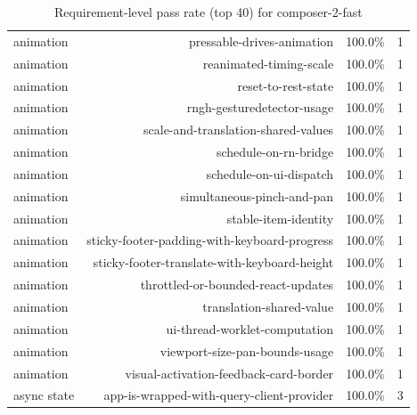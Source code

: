 \begin{table}[htbp]
\begin{tabular}{lrrr}
animation & pressable-drives-animation & 100.0\% & 1 \\
animation & reanimated-timing-scale & 100.0\% & 1 \\
animation & reset-to-rest-state & 100.0\% & 1 \\
animation & rngh-gesturedetector-usage & 100.0\% & 1 \\
animation & scale-and-translation-shared-values & 100.0\% & 1 \\
animation & schedule-on-rn-bridge & 100.0\% & 1 \\
animation & schedule-on-ui-dispatch & 100.0\% & 1 \\
animation & simultaneous-pinch-and-pan & 100.0\% & 1 \\
animation & stable-item-identity & 100.0\% & 1 \\
animation & sticky-footer-padding-with-keyboard-progress & 100.0\% & 1 \\
animation & sticky-footer-translate-with-keyboard-height & 100.0\% & 1 \\
animation & throttled-or-bounded-react-updates & 100.0\% & 1 \\
animation & translation-shared-value & 100.0\% & 1 \\
animation & ui-thread-worklet-computation & 100.0\% & 1 \\
animation & viewport-size-pan-bounds-usage & 100.0\% & 1 \\
animation & visual-activation-feedback-card-border & 100.0\% & 1 \\
async state & app-is-wrapped-with-query-client-provider & 100.0\% & 3 \\
\bottomrule
\end{tabular}
\caption{Requirement-level pass rate (top 40) for composer-2-fast}
\end{table}
